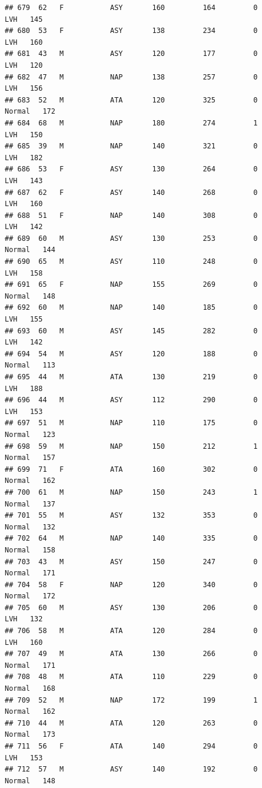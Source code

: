 \documentclass[
]{article}
\begin{document}
\begin{verbatim}
## 679  62   F           ASY       160         164         0        LVH   145
## 680  53   F           ASY       138         234         0        LVH   160
## 681  43   M           ASY       120         177         0        LVH   120
## 682  47   M           NAP       138         257         0        LVH   156
## 683  52   M           ATA       120         325         0     Normal   172
## 684  68   M           NAP       180         274         1        LVH   150
## 685  39   M           NAP       140         321         0        LVH   182
## 686  53   F           ASY       130         264         0        LVH   143
## 687  62   F           ASY       140         268         0        LVH   160
## 688  51   F           NAP       140         308         0        LVH   142
## 689  60   M           ASY       130         253         0     Normal   144
## 690  65   M           ASY       110         248         0        LVH   158
## 691  65   F           NAP       155         269         0     Normal   148
## 692  60   M           NAP       140         185         0        LVH   155
## 693  60   M           ASY       145         282         0        LVH   142
## 694  54   M           ASY       120         188         0     Normal   113
## 695  44   M           ATA       130         219         0        LVH   188
## 696  44   M           ASY       112         290         0        LVH   153
## 697  51   M           NAP       110         175         0     Normal   123
## 698  59   M           NAP       150         212         1     Normal   157
## 699  71   F           ATA       160         302         0     Normal   162
## 700  61   M           NAP       150         243         1     Normal   137
## 701  55   M           ASY       132         353         0     Normal   132
## 702  64   M           NAP       140         335         0     Normal   158
## 703  43   M           ASY       150         247         0     Normal   171
## 704  58   F           NAP       120         340         0     Normal   172
## 705  60   M           ASY       130         206         0        LVH   132
## 706  58   M           ATA       120         284         0        LVH   160
## 707  49   M           ATA       130         266         0     Normal   171
## 708  48   M           ATA       110         229         0     Normal   168
## 709  52   M           NAP       172         199         1     Normal   162
## 710  44   M           ATA       120         263         0     Normal   173
## 711  56   F           ATA       140         294         0        LVH   153
## 712  57   M           ASY       140         192         0     Normal   148

\end{verbatim}
\end{document}
